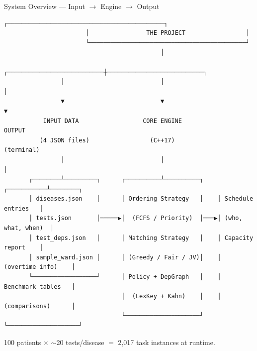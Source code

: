 \documentclass[aspectratio=169, 11pt]{beamer}
\begin{document}
\begin{frame}[fragile]{System Overview --- Input \(\to\) Engine \(\to\) Output}
  \begin{center}
    \begin{tcolorbox}[enhanced, breakable=false,
                      colback=boxbg, colframe=ruleblue,
                      boxrule=0.4pt, arc=2pt,
                      left=4pt, right=4pt, top=2pt, bottom=2pt,
                      width=\dimexpr\textwidth+0.6cm\relax,
                      enlarge left by=-0.3cm]
\begin{Verbatim}[fontsize=\scriptsize]
                       ┌────────────────────────────────────────────┐
                       │                THE PROJECT                 │
                       └────────────────────────────────────────────┘
                                            │
                ┌───────────────────────────┼───────────────────────────┐
                │                           │                           │
                ▼                           ▼                           ▼
           INPUT DATA                  CORE ENGINE                   OUTPUT
          (4 JSON files)                 (C++17)                   (terminal)
                │                           │                           │
       ┌────────┴─────────┐      ┌──────────┴──────────┐    ┌───────────┴────────┐
       │ diseases.json    │      │ Ordering Strategy   │    │ Schedule entries   │
       │ tests.json       │─────▶│  (FCFS / Priority)  │───▶│ (who, what, when)  │
       │ test_deps.json   │      │ Matching Strategy   │    │ Capacity report    │
       │ sample_ward.json │      │ (Greedy / Fair / JV)│    │ (overtime info)    │
       └──────────────────┘      │ Policy + DepGraph   │    │ Benchmark tables   │
                                 │  (LexKey + Kahn)    │    │ (comparisons)      │
                                 └─────────────────────┘    └────────────────────┘
\end{Verbatim}
    \end{tcolorbox}
  \end{center}
  \begin{center}\footnotesize\color{slate}
    100 patients $\times$ $\sim$20 tests/disease $=$ 2{,}017 task instances at runtime.
  \end{center}
\end{frame}
\end{document}
